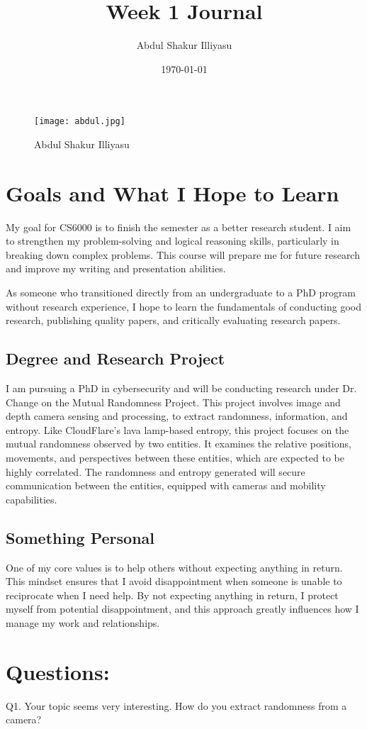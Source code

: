 \documentclass{article}
\title{Week 1 Journal}
\author{Abdul Shakur Illiyasu}
\date{\today}
\begin{document}
\maketitle

\begin{figure}[ht]
    \centering
    \texttt{[image: abdul.jpg]}
    \caption{Abdul Shakur Illiyasu}
    \label{fig: picture.jpg}
\end{figure}

\section{Goals and What I Hope to Learn}

My goal for CS6000 is to finish the semester as a better research student. I aim to strengthen my problem-solving and logical reasoning skills, particularly in breaking down complex problems. This course will prepare me for future research and improve my writing and presentation abilities.

As someone who transitioned directly from an undergraduate to a PhD program without research experience, I hope to learn the fundamentals of conducting good research, publishing quality papers, and critically evaluating research papers.

\subsection{Degree and Research Project}
I am pursuing a PhD in cybersecurity and will be conducting research under Dr. Change on the Mutual Randomness Project. This project involves image and depth camera sensing and processing, to extract randomness, information, and entropy. Like CloudFlare’s lava lamp-based entropy, this project focuses on the mutual randomness observed by two entities. It examines the relative positions, movements, and perspectives between these entities, which are expected to be highly correlated. The randomness and entropy generated will secure communication between the entities, equipped with cameras and mobility capabilities.

\subsection {Something Personal}
One of my core values is to help others without expecting anything in return. This mindset ensures that I avoid disappointment when someone is unable to reciprocate when I need help. By not expecting anything in return, I protect myself from potential disappointment, and this approach greatly influences how I manage my work and relationships.




\section*{Questions: }
Q1. Your topic seems very interesting. How do you extract randomness from a camera?
\end{document}
